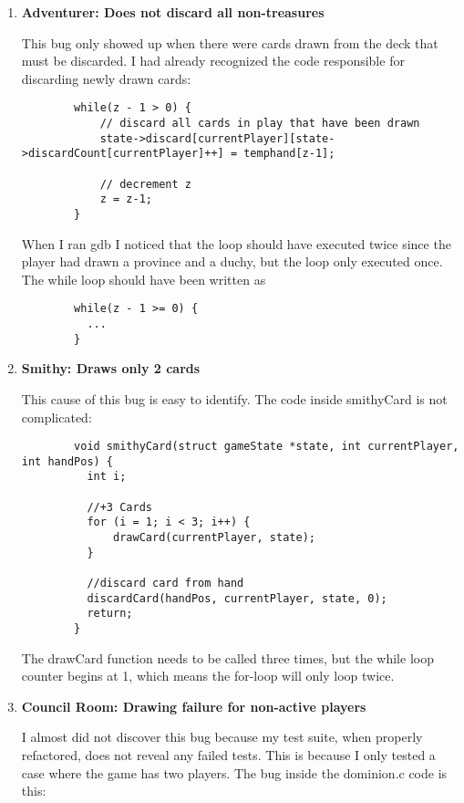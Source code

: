 \documentclass[11pt,letterpaper]{article}
\begin{document}
\begin{enumerate}[label=\Roman*.]
\begin{enumerate}[label=]
      \item \textbf{Adventurer: Does not discard all non-treasures}

        This bug only showed up when there were cards drawn from the deck
        that must be discarded. I had already recognized the code responsible
        for discarding newly drawn cards:
        \begin{lstlisting}
        while(z - 1 > 0) {
            // discard all cards in play that have been drawn
            state->discard[currentPlayer][state->discardCount[currentPlayer]++] = temphand[z-1]; 

            // decrement z
            z = z-1;
        }
        \end{lstlisting}
        When I ran gdb I noticed that the loop should have 
        executed twice since the player had drawn a province and a duchy,
        but the loop only executed once. The while loop should have been 
        written as 
        \begin{lstlisting}
        while(z - 1 >= 0) {
          ...
        }
        \end{lstlisting}

      \item \textbf{Smithy: Draws only 2 cards}
        
        This cause of this bug is easy to identify. The code inside smithyCard
        is not complicated:

        \begin{lstlisting}
        void smithyCard(struct gameState *state, int currentPlayer, int handPos) {
          int i;

          //+3 Cards
          for (i = 1; i < 3; i++) {
              drawCard(currentPlayer, state);
          }

          //discard card from hand
          discardCard(handPos, currentPlayer, state, 0);
          return;
        }
        \end{lstlisting}

        The drawCard function needs to be called three times, but the while
        loop counter begins at 1, which means the for-loop will only loop
        twice. 

      \item \textbf{Council Room: Drawing failure for non-active players}

        I almost did not discover this bug because my test suite, when 
        properly refactored, does not reveal any failed tests. This is
        because I only tested a case where the game has two players. The
        bug inside the dominion.c code is this: 


\end{enumerate}
\end{enumerate}
\end{document}
